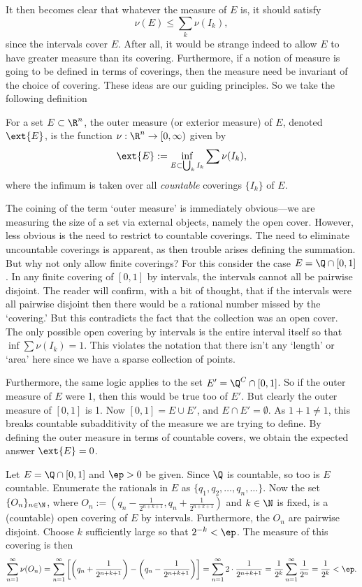 It then becomes clear that whatever the measure of $E$ is, it should satisfy
	\[
	\nu(E) \leq \sum_k \nu(I_k),
	\]
since the intervals cover $E$. After all, it would be strange indeed to allow $E$ to have greater measure than its covering. Furthermore, if a notion of measure is going to be defined in terms of coverings, then the measure need be invariant of the choice of covering. These ideas are our guiding principles. So we take the following definition 


\begin{dfn}
For a set $E \subset \R^n$, the outer measure (or exterior measure) of $E$, denoted $\ext{E}$, is the function $\nu: \R^n \to [0,\infty)$ given by
	\[
	\ext{E}:= \inf_{E \subset \bigcup_k I_k} \sum \nu(I_k),
	\]
where the infimum is taken over all \emph{countable} coverings $\{I_k\}$ of $E$. 
\end{dfn}


The coining of the term `outer measure' is immediately obvious---we are measuring the size of a set via external objects, namely the open cover. However, less obvious is the need to restrict to countable coverings. The need to eliminate uncountable coverings is apparent, as then trouble arises defining the summation. But why not only allow finite coverings? For this consider the case $E= \Q \cap [0,1]$. In any finite covering of $[0,1]$ by intervals, the intervals cannot all be pairwise disjoint. The reader will confirm, with a bit of thought, that if the intervals were all pairwise disjoint then there would be a rational number missed by the `covering.' But this contradicts the fact that the collection was an open cover. The only possible open covering by intervals is the entire interval itself so that $\inf \sum \nu(I_k)=1$. This violates the notation that there isn't any `length' or `area' here since we have a sparse collection of points. 


Furthermore, the same logic applies to the set $E'=\Q^C \cap [0,1]$. So if the outer measure of $E$ were 1, then this would be true too of $E'$. But clearly the outer measure of $[0,1]$ is 1. Now $[0,1]=E \cup E'$, and $E \cap E'=\emptyset$. As $1+1 \neq 1$, this breaks countable subadditivity of the measure we are trying to define. By defining the outer measure in terms of countable covers, we obtain the expected answer $\ext{E}=0$. 


\begin{ex}
Let $E=\Q \cap [0,1]$ and $\ep>0$ be given. Since $\Q$ is countable, so too is $E$ countable. Enumerate the rationals in $E$ as $\{q_1,q_2,\ldots,q_n,\ldots\}$. Now the set $\{O_n\}_{n \in \N}$, where $O_n:= (q_n- \frac{1}{2^{n+k+1}}, q_n+\frac{1}{2^{n+k+1}})$ and $k \in \N$ is fixed, is a (countable) open covering of $E$ by intervals. Furthermore, the $O_n$ are pairwise disjoint. Choose $k$ sufficiently large so that $2^{-k}<\ep$. The measure of this covering is then
	\[
	\sum_{n=1}^\infty \nu(O_n)= \sum_{n=1}^\infty \left[ \left(q_n+\frac{1}{2^{n+k+1}}\right) - \left(q_n- \frac{1}{2^{n+k+1}}\right) \right]= \sum_{n=1}^\infty 2 \cdot \dfrac{1}{2^{n+k+1}}= \dfrac{1}{2^k} \sum_{n=1}^\infty \dfrac{1}{2^n}= \dfrac{1}{2^k}<\ep.
	\] \xqed
\end{ex}


